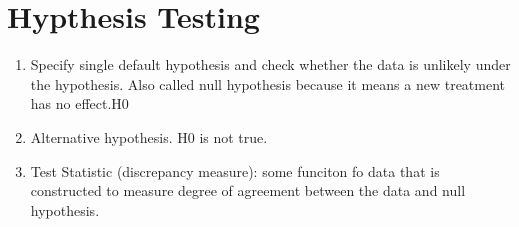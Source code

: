 \documentclass[11pt]{amsart}
\begin{document}
  \section{Hypthesis Testing}
  \begin{enumerate}
    \item Specify single default hypothesis and check whether the data is
  unlikely under the hypothesis. Also called null hypothesis because it means
  a new treatment has no effect.H0
\item Alternative hypothesis. H0 is not true.
\item Test Statistic (discrepancy measure): some funciton fo data that is
  constructed to measure degree of agreement between the data and null
  hypothesis.
  \end{enumerate}
\end{document}
